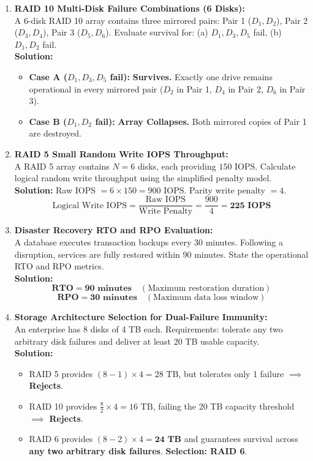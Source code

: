 \begin{enumerate}[label=\textbf{Problem \arabic*.},leftmargin=1.5cm]
\item \textbf{RAID 10 Multi-Disk Failure Combinations (6 Disks):} \\
A 6-disk RAID 10 array contains three mirrored pairs: Pair 1 ($D_1, D_2$), Pair 2 ($D_3, D_4$), Pair 3 ($D_5, D_6$). Evaluate survival for: (a) $D_1, D_3, D_5$ fail, (b) $D_1, D_2$ fail. \\
\textbf{Solution:}
\begin{itemize}
    \item \textbf{Case A ($D_1, D_3, D_5$ fail):} \textbf{Survives.} Exactly one drive remains operational in every mirrored pair ($D_2$ in Pair 1, $D_4$ in Pair 2, $D_6$ in Pair 3).
    \item \textbf{Case B ($D_1, D_2$ fail):} \textbf{Array Collapses.} Both mirrored copies of Pair 1 are destroyed.
\end{itemize}

\item \textbf{RAID 5 Small Random Write IOPS Throughput:} \\
A RAID 5 array contains $N = 6$ disks, each providing $150\text{ IOPS}$. Calculate logical random write throughput using the simplified penalty model. \\
\textbf{Solution:} Raw IOPS $= 6 \times 150 = 900\text{ IOPS}$. Parity write penalty $= 4$.
\[
\text{Logical Write IOPS} = \frac{\text{Raw IOPS}}{\text{Write Penalty}} = \frac{900}{4} = \mathbf{225\text{ IOPS}}
\]

\item \textbf{Disaster Recovery RTO and RPO Evaluation:} \\
A database executes transaction backups every 30 minutes. Following a disruption, services are fully restored within 90 minutes. State the operational RTO and RPO metrics. \\
\textbf{Solution:}
\[
\mathbf{\text{RTO} = 90\text{ minutes}} \quad (\text{Maximum restoration duration})
\]
\[
\mathbf{\text{RPO} = 30\text{ minutes}} \quad (\text{Maximum data loss window})
\]

\item \textbf{Storage Architecture Selection for Dual-Failure Immunity:} \\
An enterprise has 8 disks of 4 TB each. Requirements: tolerate any two arbitrary disk failures and deliver at least 20 TB usable capacity. \\
\textbf{Solution:}
\begin{itemize}
    \item RAID 5 provides $(8 - 1) \times 4 = 28\text{ TB}$, but tolerates only 1 failure $\implies$ \textbf{Rejects}.
    \item RAID 10 provides $\frac{8}{2} \times 4 = 16\text{ TB}$, failing the 20 TB capacity threshold $\implies$ \textbf{Rejects}.
    \item RAID 6 provides $(8 - 2) \times 4 = \mathbf{24\text{ TB}}$ and guarantees survival across \textbf{any two arbitrary disk failures}. \textbf{Selection: RAID 6}.
\end{itemize}
\end{enumerate}

